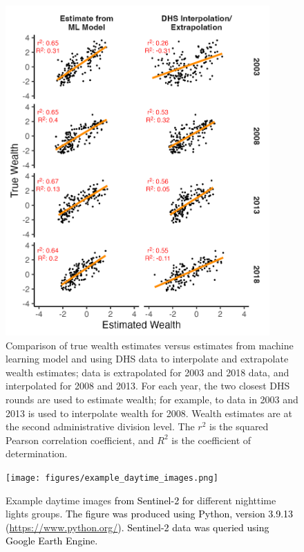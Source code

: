 \documentclass{article}
\begin{document}
\begin{figure}[H]
    \centering
    \includegraphics[width=0.9\textwidth]{figures/policy_exp_nigeria_gadm_2.png}
    \caption{Comparison of true wealth estimates versus estimates from machine learning model and using DHS data to interpolate and extrapolate wealth estimates; data is extrapolated for 2003 and 2018 data, and interpolated for 2008 and 2013. For each year, the two closest DHS rounds are used to estimate wealth; for example, to data in 2003 and 2013 is used to interpolate wealth for 2008. Wealth estimates are at the second administrative division level. The $r^2$ is the squared Pearson correlation coefficient, and $R^2$ is the coefficient of determination.}
     \label{fig:policy_exp_nigeria_gadm_2}
\end{figure}
\color{black}

\begin{figure}[H]
    \centering
    \texttt{[image: figures/example\_daytime\_images.png]}
    \caption{Example daytime images \textcolor{black}{from Sentinel-2 for} different nighttime lights groups\textcolor{black}{. The figure was produced using Python, version 3.9.13 (\url{https://www.python.org/}). Sentinel-2 data was queried using Google Earth Engine.}}
     \label{fig:example_daytime_images}
\end{figure}
\end{document}
